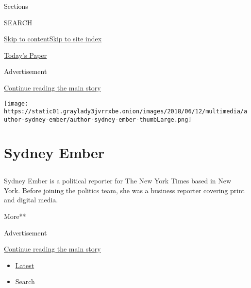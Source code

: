 Sections

SEARCH

\protect\hyperlink{site-content}{Skip to
content}\protect\hyperlink{site-index}{Skip to site index}

\href{https://myaccount.nytimes3xbfgragh.onion/auth/login?response_type=cookie\&client_id=vi}{}

\href{https://www.nytimes3xbfgragh.onion/section/todayspaper}{Today's
Paper}

Advertisement

\protect\hyperlink{after-top}{Continue reading the main story}

\texttt{[image: https://static01.graylady3jvrrxbe.onion/images/2018/06/12/multimedia/author-sydney-ember/author-sydney-ember-thumbLarge.png]}

\hypertarget{sydney-ember}{%
\section{Sydney Ember}\label{sydney-ember}}

\subsection{}

Sydney Ember is a political reporter for The New York Times based in New
York. Before joining the politics team, she was a business reporter
covering print and digital media.

More**

Advertisement

\protect\hyperlink{after-mid1}{Continue reading the main story}

\begin{itemize}
\tightlist
\item
  \protect\hyperlink{stream-panel}{Latest}
\item
  Search
\end{itemize}

